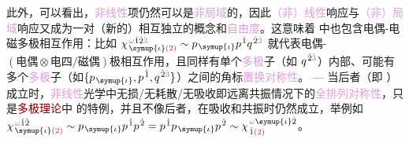 此外，可以看出，\textcolor{Plum}{非线性}项仍然可以是\textcolor{Plum}{非局域}的，因此\textcolor{Plum}{（非）线性}响应与\textcolor{Plum}{（非）局域}响应又成为一对（新的）相互独立的概念和\textcolor{Plum}{自由度}。这意味着  中也包含\textcolor{NavyBlue}{电偶-电磁多}极相互作用：比如 $\chi^{\;\! \mathcolor{gray}{\omega} \hat{1} \hat{2} \mathcolor{gray}{\hat{3}}}_{\;\! \symup{\iota} \textcolor{Maroon}{(2)}} \sim p_{\;\! \symup{\iota}} p^{\;\! \hat{1}} q^{\;\! \hat{2} \mathcolor{gray}{\hat{3}}}$ 就代表\textcolor{NavyBlue}{电偶-$(\text{电偶}\otimes\text{电四/磁偶})$}极相互作用，且同样有单个\textcolor{Plum}{多极}子（如 $q^{\;\! \hat{2} \mathcolor{gray}{\hat{3}}}$）内部、可能有多个{\textcolor{Plum}{多极}子}（如$\{p_{\;\! \symup{\iota}}, p^{\;\! \hat{1}}, q^{\;\! \hat{2} \mathcolor{gray}{\hat{3}}}\}$）之间的角标\textcolor{Plum}{置换对称性}。 ---  当后者（即 ）成立时，\textcolor{Plum}{非线性}光学中无\textcolor{NavyBlue}{损}/无\textcolor{NavyBlue}{耗散}/无\textcolor{NavyBlue}{吸收}即远离\textcolor{NavyBlue}{共振}情况下的\textcolor{Plum}{全排列对称性}\cite{boydNonlinearOptics2019}，只是\textcolor{Maroon}{多极理论}中  的特例，并且不像后者，在\textcolor{NavyBlue}{吸收}和\textcolor{NavyBlue}{共振}时仍然成立，举例如 $\chi^{\;\! \mathcolor{gray}{\omega} \hat{1} \hat{2}}_{\;\! \symup{\iota} \textcolor{Maroon}{(2)}} \sim p_{\;\! \symup{\iota}} p^{\;\! \hat{1}} p^{\;\! \hat{2}} = p^{\;\! \hat{1}} p_{\;\! \symup{\iota}} p^{\;\! \hat{2}} \sim \chi^{\;\! \mathcolor{gray}{\omega} \symup{\iota} \hat{2}}_{\;\! \hat{1} \textcolor{Maroon}{(2)}}$\cite{raabMultipoleTheoryElectromagnetism2004}。


